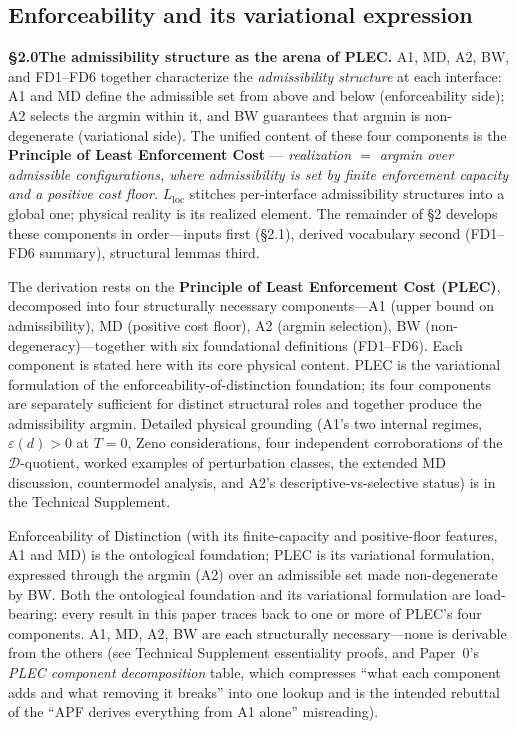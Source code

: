 \documentclass[11pt]{article}
\theoremstyle{remark}
\begin{document}
\subsection{Enforceability and its variational expression}
\label{sec:input_grounding}

\smallskip\noindent\textbf{\S2.0\quad The admissibility structure as the arena of PLEC.}  A1, MD, A2, BW, and FD1--FD6 together characterize the \emph{admissibility structure} at each interface: A1 and MD define the admissible set from above and below (enforceability side); A2 selects the argmin within it, and BW guarantees that argmin is non-degenerate (variational side).  The unified content of these four components is the \textbf{Principle of Least Enforcement Cost} --- \textit{realization $=$ argmin over admissible configurations, where admissibility is set by finite enforcement capacity and a positive cost floor.}  $L_{\mathrm{loc}}$ stitches per-interface admissibility structures into a global one; physical reality is its realized element.  The remainder of \S2 develops these components in order---inputs first (\S2.1), derived vocabulary second (FD1--FD6 summary), structural lemmas third.

\medskip\noindent The derivation rests on the \textbf{Principle of Least Enforcement Cost (PLEC)}, decomposed into four structurally necessary components---A1 (upper bound on admissibility), MD (positive cost floor), A2 (argmin selection), BW (non-degeneracy)---together with six foundational definitions (FD1--FD6).  Each component is stated here with its core physical content.  PLEC is the variational formulation of the enforceability-of-distinction foundation; its four components are separately sufficient for distinct structural roles and together produce the admissibility argmin.  Detailed physical grounding (A1's two internal regimes, $\varepsilon(d) > 0$ at $T = 0$, Zeno considerations, four independent corroborations of the $\mathcal{D}$-quotient, worked examples of perturbation classes, the extended MD discussion, countermodel analysis, and A2's descriptive-vs-selective status) is in the Technical Supplement.\label{assumption:MD}%
\label{cor:disjoint_mech}

Enforceability of Distinction (with its finite-capacity and positive-floor features, A1 and MD) is the ontological foundation; PLEC is its variational formulation, expressed through the argmin (A2) over an admissible set made non-degenerate by BW.  Both the ontological foundation and its variational formulation are load-bearing: every result in this paper traces back to one or more of PLEC's four components.  A1, MD, A2, BW are each structurally necessary---none is derivable from the others (see Technical Supplement essentiality proofs, and Paper~0's \emph{PLEC component decomposition} table, which compresses ``what each component adds and what removing it breaks'' into one lookup and is the intended rebuttal of the ``APF derives everything from A1 alone'' misreading).
\end{document}
